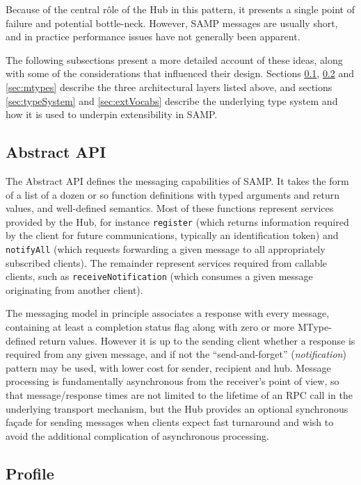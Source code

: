 \documentclass[5p]{elsarticle}
\begin{document}
Because of the central r\^{o}le of the Hub in this pattern,
it presents a single point of failure and potential bottle-neck.
However, SAMP messages are usually short,
and in practice performance issues have not generally been apparent.

The following subsections present a more detailed account of
these ideas, along with some of the considerations that influenced
their design.
Sections \ref{sec:abstractApi}, \ref{sec:profile} and \ref{sec:mtypes}
describe the three architectural layers listed above,
and sections \ref{sec:typeSystem} and \ref{sec:extVocabs}
describe the underlying type system and how it is used to underpin
extensibility in SAMP.

\subsection{Abstract API} \label{sec:abstractApi}

The Abstract API defines the messaging capabilities of SAMP.
It takes the form of a list of a dozen or so function definitions
with typed arguments and return values, and well-defined semantics.
Most of these functions represent services provided by the Hub,
for instance
{\tt register} (which returns information required by the
client for future communications, typically an identification token)
and {\tt notifyAll} (which requests forwarding a given message to
all appropriately subscribed clients).
The remainder represent services required from callable clients, such as
{\tt receiveNotification} (which consumes a given message originating
from another client).

The messaging model in principle associates
a response with every message, containing at least a completion
status flag along with zero or more MType-defined return values.
However it is up to the sending client whether a response is
required from any given message, and if not the ``send-and-forget''
({\em notification\/}) pattern may be used,
with lower cost for sender, recipient and hub.
Message processing is fundamentally asynchronous from the
receiver's point of view, so that message/response times are
not limited to the lifetime of an RPC call in the underlying
transport mechanism, but the Hub provides an optional synchronous
fa\c{c}ade for sending messages when clients expect fast turnaround
and wish to avoid the additional complication of asynchronous processing.


\subsection{Profile} \label{sec:profile}
\end{document}
